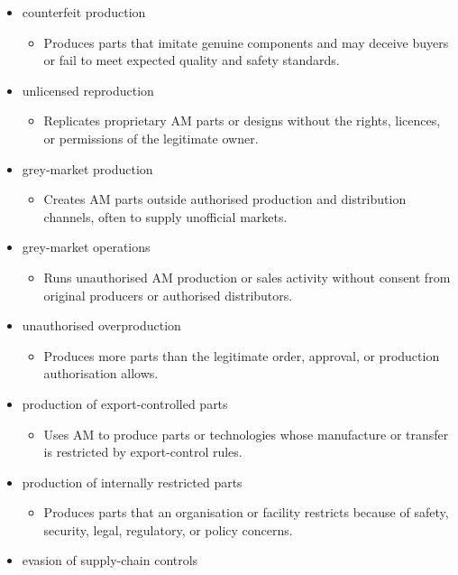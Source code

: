 \documentclass[10pt,a4paper,oneside]{report}
\begin{document}
\begin{itemize}
\item counterfeit production
\begin{itemize}
\item Produces parts that imitate genuine components and may deceive buyers or fail to meet expected quality and safety standards.
\end{itemize}
\item unlicensed reproduction
\begin{itemize}
\item Replicates proprietary AM parts or designs without the rights, licences, or permissions of the legitimate owner.
\end{itemize}
\item grey-market production
\begin{itemize}
\item Creates AM parts outside authorised production and distribution channels, often to supply unofficial markets.
\end{itemize}
\item grey-market operations
\begin{itemize}
\item Runs unauthorised AM production or sales activity without consent from original producers or authorised distributors.
\end{itemize}
\item unauthorised overproduction
\begin{itemize}
\item Produces more parts than the legitimate order, approval, or production authorisation allows.
\end{itemize}
\item production of export-controlled parts
\begin{itemize}
\item Uses AM to produce parts or technologies whose manufacture or transfer is restricted by export-control rules.
\end{itemize}
\item production of internally restricted parts
\begin{itemize}
\item Produces parts that an organisation or facility restricts because of safety, security, legal, regulatory, or policy concerns.
\end{itemize}
\item evasion of supply-chain controls
\begin{itemize}

\end{itemize}
\end{itemize}
\end{document}
